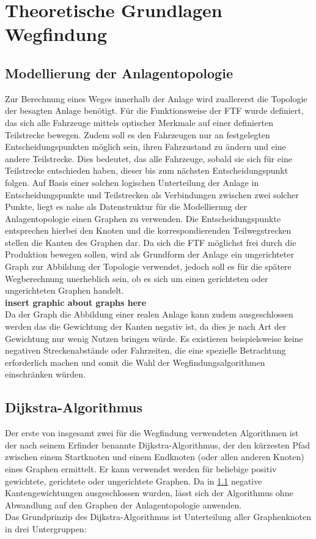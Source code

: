 \chapter{Theoretische Grundlagen Wegfindung}

\section{Modellierung der Anlagentopologie}
	\label{Graph_Anlage}
	Zur Berechnung eines Weges innerhalb der Anlage wird zuallererst die Topologie der besagten Anlage benötigt. Für die Funktionsweise der \ac{FTF} wurde definiert, das sich alle Fahrzeuge mittels optischer Merkmale auf einer definierten Teilstrecke bewegen. Zudem soll es den Fahrzeugen nur an festgelegten Entscheidungspunkten möglich sein, ihren Fahrzustand zu ändern und eine andere Teilstrecke. Dies bedeutet, das alle Fahrzeuge, sobald sie sich für eine Teilstrecke entschieden haben, dieser bis zum nächsten Entscheidungspunkt folgen. Auf Basis einer solchen logischen Unterteilung der Anlage in Entscheidungspunkte und Teilstrecken als Verbindungen zwischen zwei solcher Punkte, liegt es nahe als Datenstruktur für die Modellierung der Anlagentopologie einen Graphen zu verwenden. Die Entscheidungspunkte entsprechen hierbei den Knoten und die korrespondierenden Teilwegstrecken stellen die Kanten des Graphen dar. Da sich die \ac{FTF} möglichst frei durch die Produktion bewegen sollen, wird als Grundform der Anlage ein ungerichteter Graph zur Abbildung der Topologie verwendet, jedoch soll es für die spätere Wegberechnung unerheblich sein, ob es sich um einen gerichteten oder ungerichteten Graphen handelt.\\
	\textbf{insert graphic about graphs here}\\
	Da der Graph die Abbildung einer realen Anlage kann zudem ausgeschlossen werden das die Gewichtung der Kanten negativ ist, da dies je nach Art der Gewichtung nur wenig Nutzen bringen würde. Es existieren beispielsweise keine negativen Streckenabstände oder Fahrzeiten, die eine spezielle Betrachtung erforderlich machen und somit die Wahl der Wegfindungsalgorithmen einschränken würden.
\section{Dijkstra-Algorithmus}
	Der erste von insgesamt zwei für die Wegfindung verwendeten Algorithmen ist der nach seinem Erfinder benannte Dijkstra-Algorithmus, der den kürzesten Pfad zwischen einem Startknoten und einem Endknoten (oder allen anderen Knoten) eines Graphen ermittelt. Er kann verwendet werden für beliebige positiv gewichtete, gerichtete oder ungerichtete Graphen. Da in \ref{Graph_Anlage} negative Kantengewichtungen ausgeschlossen wurden, lässt sich der Algorithmus ohne Abwandlung auf den Graphen der Anlagentopologie anwenden. \\
	Das Grundprinzip des Dijkstra-Algorithmus ist Unterteilung aller Graphenknoten in drei Untergruppen\cite{DijkstraAlg}:
	
